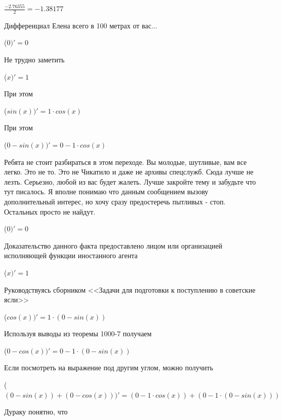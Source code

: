 \documentclass[12pt,a4paper,fleqn]{article}
\begin{document}
\begin{center}
\end{center}
\begin{center}$\frac{-2.76355}{2} = -1.38177$\end{center}
Дифференциал Елена всего в 100 метрах от вас...

\begin{center}
 ($0)'
  = 0$\end{center}
Не трудно заметить

\begin{center}
 ($x)'
  = 1$\end{center}
При этом

\begin{center}
 ($sin(x))'
  = 1 \cdot cos(x)$\end{center}
При этом

\begin{center}
 ($0-sin(x))'
  = 0-1 \cdot cos(x)$\end{center}
Ребята не стоит разбираться в этом переходе. Вы молодые, шутливые, вам все легко. Это не то. Это не Чикатило и даже не архивы спецслужб. Сюда лучше не лезть. Серьезно, любой из вас будет жалеть. Лучше закройте тему и забудьте что тут писалось. Я вполне понимаю что данным сообщением вызову дополнительный интерес, но хочу сразу предостеречь пытливых - стоп. Остальных просто не найдут.

\begin{center}
 ($0)'
  = 0$\end{center}
Доказательство данного факта предоставлено лицом или организацией исполняющей функции иностанного агента

\begin{center}
 ($x)'
  = 1$\end{center}
Руководствуясь сборником <<Задачи для подготовки к поступлению в советские ясли>>\cite{link1}

\begin{center}
 ($cos(x))'
  = 1 \cdot (0-sin(x))$\end{center}
Используя выводы из теоремы 1000-7 получаем

\begin{center}
 ($0-cos(x))'
  = 0-1 \cdot (0-sin(x))$\end{center}
Если посмотреть на выражение под другим углом, можно получить

\begin{center}
 ($(0-sin(x))+(0-cos(x)))'
  = (0-1 \cdot cos(x))+(0-1 \cdot (0-sin(x)))$\end{center}
Дураку понятно, что
\end{document}
